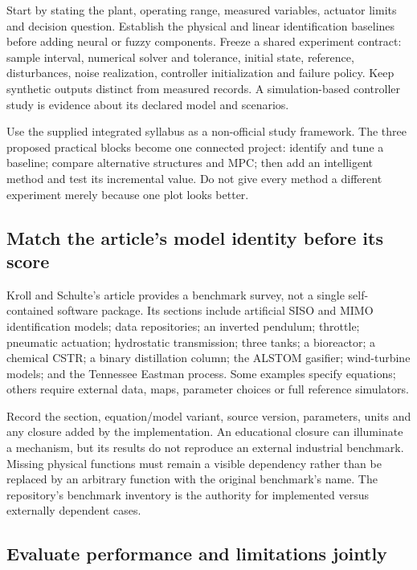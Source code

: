 \documentclass[11pt,a4paper]{article}
\begin{document}
Start by stating the plant, operating range, measured variables, actuator limits and decision question. Establish the physical and linear identification baselines before adding neural or fuzzy components. Freeze a shared experiment contract: sample interval, numerical solver and tolerance, initial state, reference, disturbances, noise realization, controller initialization and failure policy. Keep synthetic outputs distinct from measured records. A simulation-based controller study is evidence about its declared model and scenarios.


Use the supplied integrated syllabus as a non-official study framework. The three proposed practical blocks become one connected project: identify and tune a baseline; compare alternative structures and MPC; then add an intelligent method and test its incremental value. Do not give every method a different experiment merely because one plot looks better.


\subsection{Match the article's model identity before its score}

Kroll and Schulte's article provides a benchmark survey, not a single self-contained software package. Its sections include artificial SISO and MIMO identification models; data repositories; an inverted pendulum; throttle; pneumatic actuation; hydrostatic transmission; three tanks; a bioreactor; a chemical CSTR; a binary distillation column; the ALSTOM gasifier; wind-turbine models; and the Tennessee Eastman process. Some examples specify equations; others require external data, maps, parameter choices or full reference simulators.


Record the section, equation/model variant, source version, parameters, units and any closure added by the implementation. An educational closure can illuminate a mechanism, but its results do not reproduce an external industrial benchmark. Missing physical functions must remain a visible dependency rather than be replaced by an arbitrary function with the original benchmark's name. The repository's benchmark inventory is the authority for implemented versus externally dependent cases.


\subsection{Evaluate performance and limitations jointly}
\end{document}
